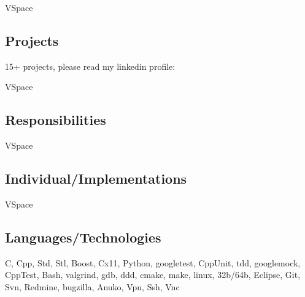 

    {VSpace}

\subsection
    {Projects}

\cventry
    {}
    {15+ projects, please read my linkedin profile: {\href{http://www.linkedin.com/pub/rados\%C5\%82aw-go\%C5\%82\%C4\%99biewski/70/832/35}
        {\linkedin}}
    }
    {}{}{}{}


    {VSpace}

\subsection
    {Responsibilities}

\cventry
    {}{}{}{}{}{}


    {VSpace}

\subsection
    {Individual/Implementations}

\cventry
    {}{}{}{}{}{}


    {VSpace}

\subsection
    {Languages/Technologies}

\cventry
    {}{C, Cpp, Std, Stl, Boost, Cx11, Python, googletest, CppUnit, tdd, googlemock, CppTest, Bash, valgrind, gdb, ddd, cmake, make, linux, 32b/64b, Eclipse, Git, Svn, Redmine, bugzilla, Anuko, Vpn, Ssh, Vnc}{}{}{}{}

